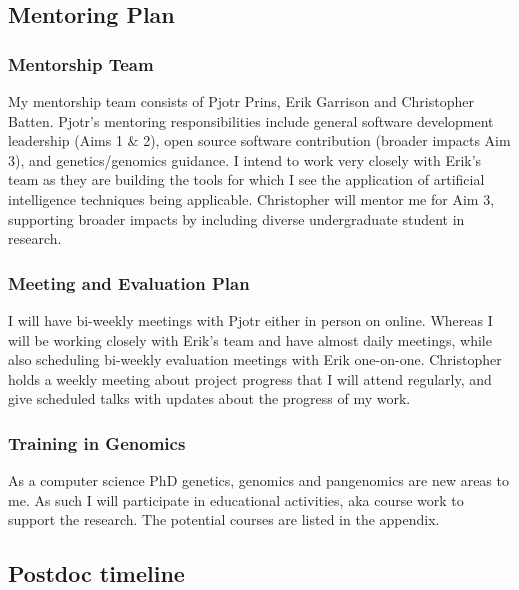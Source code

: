 \subsection{Mentoring Plan}

\subsubsection{Mentorship Team}
My mentorship team consists of Pjotr Prins, Erik Garrison and Christopher Batten. Pjotr's mentoring responsibilities include general software development leadership (Aims 1 \& 2), open source software contribution (broader impacts Aim 3), and genetics/genomics guidance.  
I intend to work very closely with Erik's team as they are building the tools for which I see the application of artificial intelligence techniques being applicable.
Christopher will mentor me for Aim 3, supporting broader impacts by including diverse undergraduate student in research.

\subsubsection{Meeting and Evaluation Plan}
I will have bi-weekly meetings with Pjotr either in person on online. 
Whereas I will be working closely with Erik's team and have almost daily meetings, while also scheduling bi-weekly evaluation meetings with Erik one-on-one.
Christopher holds a weekly meeting about project progress that I will attend regularly, and give scheduled talks with updates about the progress of my work.

\subsubsection{Training in Genomics}
As a computer science PhD genetics, genomics and pangenomics are new areas to me.
As such I will participate in educational activities, aka course work to support the research. 
The potential courses are listed in the appendix.

\subsection{Postdoc timeline}
